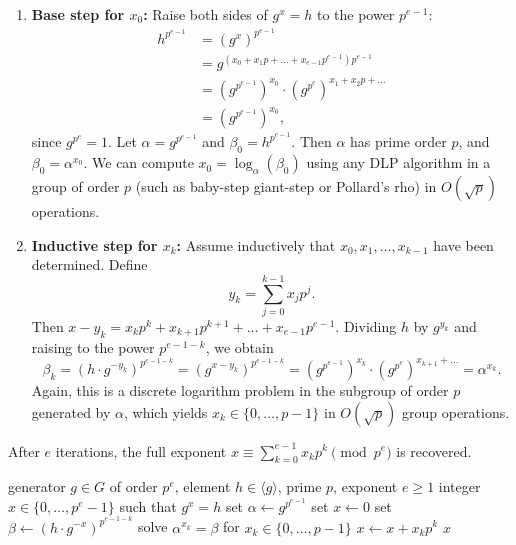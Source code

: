 \begin{enumerate}
    \item \textbf{Base step for \(x_0\):}
    Raise both sides of \(g^x = h\) to the power \(p^{e-1}\):
    \begin{align*}
        h^{p^{e-1}} &= (g^x)^{p^{e-1}} \\
        &= g^{(x_0 + x_1 p + \dots + x_{e-1} p^{e-1}) p^{e-1}} \\
        &= (g^{p^{e-1}})^{x_0} \cdot (g^{p^e})^{x_1 + x_2 p + \dots} \\
        &= (g^{p^{e-1}})^{x_0},
    \end{align*}
    since \(g^{p^e} = 1\).
    Let \(\alpha = g^{p^{e-1}}\) and \(\beta_0 = h^{p^{e-1}}\).
    Then \(\alpha\) has prime order \(p\), and \(\beta_0 = \alpha^{x_0}\).
    We can compute \(x_0 = \log_\alpha(\beta_0)\) using any DLP algorithm in a group of order \(p\) (such as baby-step giant-step or Pollard's rho) in \(O(\sqrt{p})\) operations.

    \item \textbf{Inductive step for \(x_k\):}
    Assume inductively that \(x_0, x_1, \dots, x_{k-1}\) have been determined.
    Define
    \[
        y_k = \sum_{j=0}^{k-1} x_j p^j.
    \]
    Then \(x - y_k = x_k p^k + x_{k+1} p^{k+1} + \dots + x_{e-1} p^{e-1}\).
    Dividing \(h\) by \(g^{y_k}\) and raising to the power \(p^{e-1-k}\), we obtain
    \[
        \beta_k = (h \cdot g^{-y_k})^{p^{e-1-k}} = (g^{x - y_k})^{p^{e-1-k}} = (g^{p^{e-1}})^{x_k} \cdot (g^{p^e})^{x_{k+1} + \dots} = \alpha^{x_k}.
    \]
    Again, this is a discrete logarithm problem in the subgroup of order \(p\) generated by \(\alpha\), which yields \(x_k \in \{0, \dots, p-1\}\) in \(O(\sqrt{p})\) group operations.
\end{enumerate}

After \(e\) iterations, the full exponent \(x \equiv \sum_{k=0}^{e-1} x_k p^k \pmod{p^e}\) is recovered.

\begin{algorithm}[H]
    \caption{Pohlig--Hellman for Prime-Power Order}\label{alg:pohlig-hellman-prime-power}
    \begin{algorithmic}[1]
        \Input generator \(g \in G\) of order \(p^e\), element \(h \in \langle g \rangle\), prime \(p\), exponent \(e \geq 1\)
        \Output integer \(x \in \{0, \dots, p^e - 1\}\) such that \(g^x = h\)
        \State set \(\alpha \gets g^{p^{e-1}}\)
        \State set \(x \gets 0\)
            \State set \(\beta \gets (h \cdot g^{-x})^{p^{e-1-k}}\)
            \State solve \(\alpha^{x_k} = \beta\) for \(x_k \in \{0, \dots, p-1\}\) 
            \State \(x \gets x + x_k p^k\)
        \EndFor
        \State \Return \(x\)
    \end{algorithmic}
\end{algorithm}

